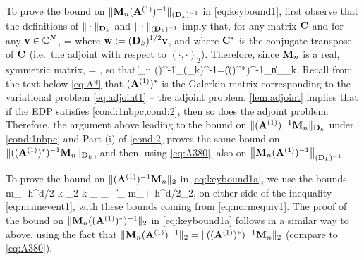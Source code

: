 To prove the bound on $\|\mathbf{M}_n(\mathbf{A}^{(1)})^{-1}\|_{(\mathbf{D}_k)^{-1}}$ in \cref{eq:keybound1}, first observe that the definitions of $\|\cdot\|_{\mathbf{D}_k}$ and $\|\cdot\|_{(\mathbf{D}_k)^{-1}}$ imply that, for any matrix $\mathbf{C}$ and for any $\mathbf{v}\in \mathbb C^N$,
\beq\label{eq:A380-0}
 = 
\eeq
where $\mathbf{w} := (\mathbf{D}_k)^{1/2}\mathbf{v}$, and where $\mathbf{C}^*$ is the conjugate transpose of $\mathbf{C}$ (i.e.~the adjoint with respect to $(\cdot,\cdot)_2$).
Therefore, since $\mathbf{M}_n$ is a real, symmetric matrix,
\beqs%
=
,
 \eeqs
 so that 
\beq\label{eq:A380} 
 \big\|\Mmat_n (\Amato)^{-1}\big\|_{(\Dmat_k)^{-1}}=\big\|((\Amato)^*)^{-1}\Mmat_n\big\|_{\Dmat_k}.
 \eeq 
Recall from the text below \cref{eq:A*} that $(\mathbf{A}^{(1)})^*$ is the Galerkin matrix corresponding to the variational problem \cref{eq:adjoint1} -- the adjoint problem. \cref{lem:adjoint} implies that if the EDP %
satisfies \cref{cond:1nbpc,cond:2}, then so does the adjoint problem. Therefore, the argument above leading to the bound on $\|(\mathbf{A}^{(1)})^{-1}\mathbf{M}_n\|_{\mathbf{D}_k}$ under \cref{cond:1nbpc} and Part (i) of \cref{cond:2} proves the same bound on $\|((\mathbf{A}^{(1)})^*)^{-1}\mathbf{M}_n\|_{\mathbf{D}_k}$, and then, using \cref{eq:A380}, also on $\big\|\mathbf{M}_n(\mathbf{A}^{(1)})^{-1}\big\|_{(\mathbf{D}_k)^{-1}}$.

To prove the bound on  $\|(\mathbf{A}^{(1)})^{-1}\mathbf{M}_n\|_{2}$ in \cref{eq:keybound1a}, we use the bounds 
\beqs
m_- h^{d/2} k \N{\tbu}_2 \leq k _{\LtDR} \leq {}_{\HokDR}
\,\tand\,
\big\|\big\|_{\LtDR} \leq m_+ h^{d/2}\N{\bff}_2,
\eeqs
on either side of the inequality \cref{eq:mainevent1}, with these bounds coming from \cref{eq:normequiv1}. The proof of the bound on 
$\|\mathbf{M}_n((\mathbf{A}^{(1)})^*)^{-1}\|_{2}$ in \cref{eq:keybound1a} follows in a similar way to above, using the fact that 
$\|\mathbf{M}_n (\mathbf{A}^{(1)})^{-1}\|_2=\|((\mathbf{A}^{(1)})^*)^{-1}\mathbf{M}_n\|_2$ (compare to \cref{eq:A380}).
%
%
\epf

